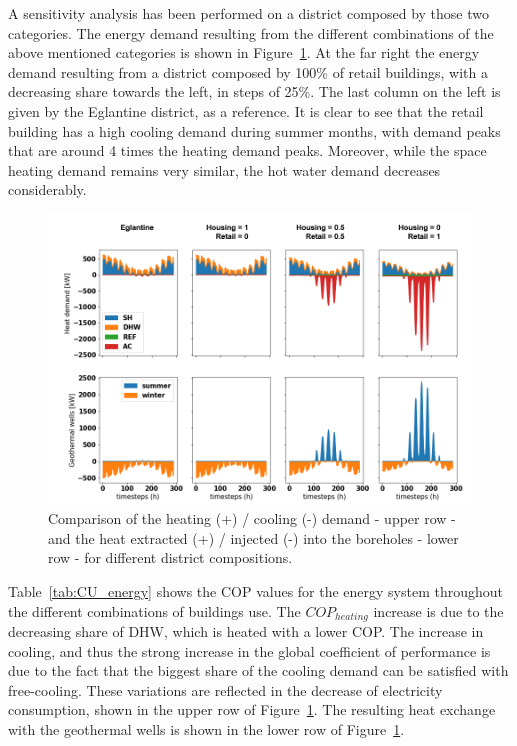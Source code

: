 \documentclass{article}
\begin{document}
A sensitivity analysis has been performed on a district composed by those two categories. The energy demand resulting from the different combinations of the above mentioned categories is shown in Figure~\ref{fig:cu}. At the far right the energy demand resulting from a district composed by 100\% of retail buildings, with a decreasing share towards the left, in steps of 25\%. The last column on the left is given by the Eglantine district, as a reference. It is clear to see that the retail building has a high cooling demand during summer months, with demand peaks that are around 4 times the heating demand peaks. Moreover, while the space heating demand remains very similar, the hot water demand decreases considerably.



\begin{figure}[tph]
	\centering
	\includegraphics[width=1\linewidth]{Images/CU}
	\caption{Comparison of the heating (+) / cooling (-) demand - upper row - and the heat extracted (+) / injected (-) into the boreholes - lower row - for different district compositions.}
	\label{fig:cu}
\end{figure}

Table~\ref{tab:CU_energy} shows the COP values for the energy system throughout the different combinations of buildings use. The $COP_{heating}$ increase is due to the decreasing share of DHW, which is heated with a lower COP. The increase in cooling, and thus the strong increase in the global coefficient of performance is due to the fact that the biggest share of the cooling demand can be satisfied with free-cooling. These variations are reflected in the decrease of electricity consumption, shown in the upper row of Figure~\ref{fig:cu}. The resulting heat exchange with the geothermal wells is shown in the lower row of Figure~\ref{fig:cu}.
\end{document}
